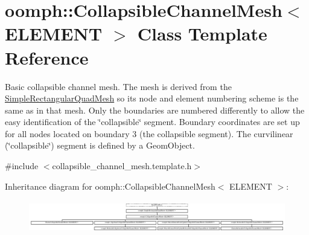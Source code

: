 \hypertarget{classoomph_1_1CollapsibleChannelMesh}{}\section{oomph\+:\+:Collapsible\+Channel\+Mesh$<$ E\+L\+E\+M\+E\+NT $>$ Class Template Reference}
\label{classoomph_1_1CollapsibleChannelMesh}


Basic collapsible channel mesh. The mesh is derived from the {\ttfamily \hyperlink{classoomph_1_1SimpleRectangularQuadMesh}{Simple\+Rectangular\+Quad\+Mesh}} so it\textquotesingle{}s node and element numbering scheme is the same as in that mesh. Only the boundaries are numbered differently to allow the easy identification of the \char`\"{}collapsible\char`\"{} segment. Boundary coordinates are set up for all nodes located on boundary 3 (the collapsible segment). The curvilinear (\char`\"{}collapsible\char`\"{}) segment is defined by a {\ttfamily Geom\+Object}.  




{\ttfamily \#include $<$collapsible\+\_\+channel\+\_\+mesh.\+template.\+h$>$}

Inheritance diagram for oomph\+:\+:Collapsible\+Channel\+Mesh$<$ E\+L\+E\+M\+E\+NT $>$\+:\begin{figure}[H]
\begin{center}
\leavevmode
\includegraphics[height=1.414141cm]{classoomph_1_1CollapsibleChannelMesh}
\end{center}
\end{figure}
